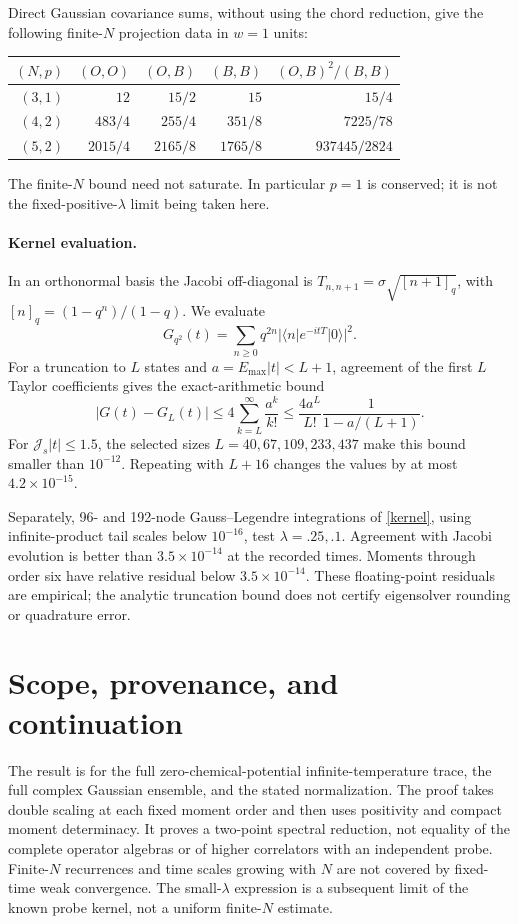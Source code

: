 \documentclass[11pt,a4paper]{article}
\newcommand{\Js}{\mathcal J_s}
\begin{document}
Direct Gaussian covariance sums, without using the chord reduction,
give the following finite-$N$ projection data in $w=1$ units:
\begin{center}
\begin{tabular}{rrrrr}\toprule
$(N,p)$ & $(O,O)$ & $(O,B)$ & $(B,B)$ & $(O,B)^2/(B,B)$\\\midrule
$(3,1)$ & $12$ & $15/2$ & $15$ & $15/4$\\
$(4,2)$ & $483/4$ & $255/4$ & $351/8$ & $7225/78$\\
$(5,2)$ & $2015/4$ & $2165/8$ & $1765/8$ & $937445/2824$\\\bottomrule
\end{tabular}
\end{center}
The finite-$N$ bound need not saturate. In particular $p=1$ is conserved;
it is not the fixed-positive-$\lambda$ limit being taken here.

\paragraph{Kernel evaluation.}
In an orthonormal basis the Jacobi off-diagonal is
$T_{n,n+1}=\sigma\sqrt{[n+1]_q}$, with
$[n]_q=(1-q^n)/(1-q)$. We evaluate
\begin{equation}
 G_{q^2}(t)=\sum_{n\ge0}q^{2n}
     |\langle n|e^{-itT}|0\rangle|^2 .
\end{equation}
For a truncation to $L$ states and $a=E_{\max}|t|<L+1$, agreement of
the first $L$ Taylor coefficients gives the exact-arithmetic bound
\begin{equation}
 |G(t)-G_L(t)|\le4\sum_{k=L}^\infty\frac{a^k}{k!}
 \le\frac{4a^L}{L!}\frac1{1-a/(L+1)}.
\end{equation}
For $\Js|t|\le1.5$, the selected sizes $L=40,67,109,233,437$
make this bound smaller than $10^{-12}$. Repeating with $L+16$
changes the values by at most $4.2\times10^{-15}$.

Separately, 96- and 192-node Gauss--Legendre integrations of
\eqref{kernel}, using infinite-product tail scales below $10^{-16}$,
test $\lambda=.25,.1$. Agreement with Jacobi evolution is better than
$3.5\times10^{-14}$ at the recorded times. Moments through order six
have relative residual below $3.5\times10^{-14}$. These floating-point
residuals are empirical; the analytic truncation bound does not certify
eigensolver rounding or quadrature error.

\newpage
\section{Scope, provenance, and continuation}
The result is for the full zero-chemical-potential infinite-temperature
trace, the full complex Gaussian ensemble, and the stated normalization.
The proof takes double scaling at each fixed moment order and then
uses positivity and compact moment determinacy. It proves a two-point
spectral reduction, not equality of the complete operator algebras or
of higher correlators with an independent probe. Finite-$N$ recurrences
and time scales growing with $N$ are not covered by fixed-time weak
convergence. The small-$\lambda$ expression is a subsequent limit of
the known probe kernel, not a uniform finite-$N$ estimate.
\end{document}
